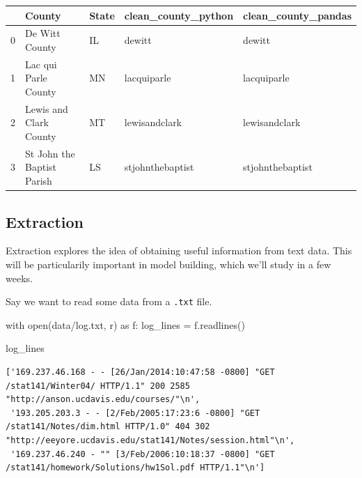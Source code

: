 \documentclass[
  letterpaper,
  DIV=11,
  numbers=noendperiod]{scrreprt}
\newenvironment{Shaded}{\begin{snugshade}}{\end{snugshade}}
\newcommand{\BuiltInTok}[1]{\textcolor[rgb]{0.00,0.23,0.31}{#1}}
\newcommand{\ControlFlowTok}[1]{\textcolor[rgb]{0.00,0.23,0.31}{#1}}
\newcommand{\ImportTok}[1]{\textcolor[rgb]{0.00,0.46,0.62}{#1}}
\newcommand{\NormalTok}[1]{\textcolor[rgb]{0.00,0.23,0.31}{#1}}
\newcommand{\OperatorTok}[1]{\textcolor[rgb]{0.37,0.37,0.37}{#1}}
\newcommand{\StringTok}[1]{\textcolor[rgb]{0.13,0.47,0.30}{#1}}
\begin{document}
\begin{tabular}{lllll}
\toprule
{} &                      County & State & clean\_county\_python & clean\_county\_pandas \\
\midrule
0 &              De Witt County &    IL &              dewitt &              dewitt \\
1 &        Lac qui Parle County &    MN &         lacquiparle &         lacquiparle \\
2 &      Lewis and Clark County &    MT &       lewisandclark &       lewisandclark \\
3 &  St John the Baptist Parish &    LS &    stjohnthebaptist &    stjohnthebaptist \\
\bottomrule
\end{tabular}

\hypertarget{extraction}{%
\subsection{Extraction}\label{extraction}}

Extraction explores the idea of obtaining useful information from text
data. This will be particularily important in model building, which
we'll study in a few weeks.

Say we want to read some data from a \texttt{.txt} file.

\begin{Shaded}
\begin{Highlighting}[]
\ControlFlowTok{with} \BuiltInTok{open}\NormalTok{(}\StringTok{\textquotesingle{}data/log.txt\textquotesingle{}}\NormalTok{, }\StringTok{\textquotesingle{}r\textquotesingle{}}\NormalTok{) }\ImportTok{as}\NormalTok{ f:}
\NormalTok{    log\_lines }\OperatorTok{=}\NormalTok{ f.readlines()}
\end{Highlighting}
\end{Shaded}

\begin{Shaded}
\begin{Highlighting}[]
\NormalTok{log\_lines}
\end{Highlighting}
\end{Shaded}

\begin{verbatim}
['169.237.46.168 - - [26/Jan/2014:10:47:58 -0800] "GET /stat141/Winter04/ HTTP/1.1" 200 2585 "http://anson.ucdavis.edu/courses/"\n',
 '193.205.203.3 - - [2/Feb/2005:17:23:6 -0800] "GET /stat141/Notes/dim.html HTTP/1.0" 404 302 "http://eeyore.ucdavis.edu/stat141/Notes/session.html"\n',
 '169.237.46.240 - "" [3/Feb/2006:10:18:37 -0800] "GET /stat141/homework/Solutions/hw1Sol.pdf HTTP/1.1"\n']
\end{verbatim}
\end{document}
